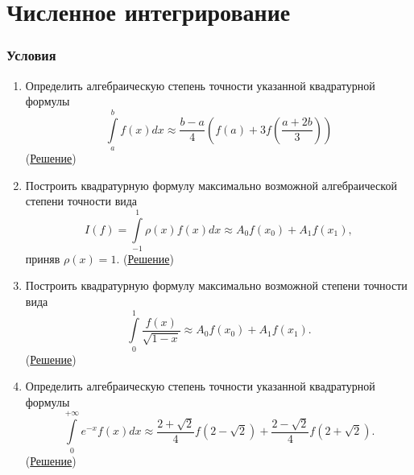 \documentclass[a4paper, 12pt]{article}
\begin{document}
	\section*{Численное интегрирование}
	\subsubsection*{Условия}
	\begin{enumerate}
		\item Определить алгебраическую степень точности указанной квадратурной формулы
		$$\int\limits_a^b f(x)dx \approx \dfrac{b-a}{4}\left(f(a) + 3f\left(\dfrac{a+2b}{3}\right)\right)$$ (\hyperlink{t1}{Решение})
		\item Построить квадратурную формулу максимально возможной алгебраической степени точности вида $$I(f) = \int\limits_{-1}^{1}\rho (x) f(x)dx \approx A_0 f(x_0) + A_1 f(x_1),$$
		приняв $\rho(x) = 1$. (\hyperlink{t2}{Решение})
		\item Построить квадратурную формулу максимально возможной степени точности вида $$\int\limits_0^1 \dfrac{f(x)}{\sqrt{1-x}} \approx A_0 f(x_0) + A_1 f(x_1).$$ (\hyperlink{t3}{Решение})
		\item Определить алгебраическую степень точности указанной квадратурной формулы $$\int\limits_0^{+\infty} e^{-x} f(x)dx\approx \dfrac{2+\sqrt2}{4} f(2-\sqrt2) + \dfrac{2-\sqrt2}{4}f(2+\sqrt2).$$ (\hyperlink{t4}{Решение})
	\end{enumerate}
	
	\newpage
\end{document}
